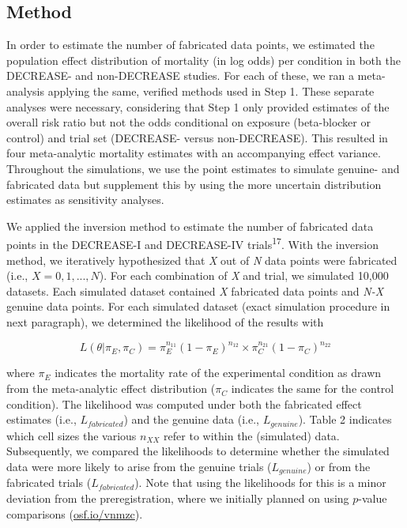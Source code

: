 \documentclass[]{article}
\begin{document}
\subsection{Method}\label{method-1}

In order to estimate the number of fabricated data points, we estimated
the population effect distribution of mortality (in log odds) per
condition in both the DECREASE- and non-DECREASE studies. For each of
these, we ran a meta-analysis applying the same, verified methods used
in Step 1. These separate analyses were necessary, considering that Step
1 only provided estimates of the overall risk ratio but not the odds
conditional on exposure (beta-blocker or control) and trial set
(DECREASE- versus non-DECREASE). This resulted in four meta-analytic
mortality estimates with an accompanying effect variance. Throughout the
simulations, we use the point estimates to simulate genuine- and
fabricated data but supplement this by using the more uncertain
distribution estimates as sensitivity analyses.

We applied the inversion method to estimate the number of fabricated
data points in the DECREASE-I and DECREASE-IV
trials\textsuperscript{17}. With the inversion method, we iteratively
hypothesized that \emph{X} out of \emph{N} data points were fabricated
(i.e., \(X={0, 1, ..., N}\)). For each combination of \emph{X} and
trial, we simulated 10,000 datasets. Each simulated dataset contained
\emph{X} fabricated data points and \emph{N-X} genuine data points. For
each simulated dataset (exact simulation procedure in next paragraph),
we determined the likelihood of the results with

\begin{equation}
\label{eq1}
L(\theta|\pi_{E},\pi_{C})=\pi_{E}^{n_{11}}(1-\pi_{E})^{n_{12}} \times \pi_{C}^{n_{21}}(1 - \pi_{C})^{n_{22}}
\end{equation}

where \(\pi_{E}\) indicates the mortality rate of the experimental
condition as drawn from the meta-analytic effect distribution
(\(\pi_{C}\) indicates the same for the control condition). The
likelihood was computed under both the fabricated effect estimates
(i.e., \(L_{fabricated}\)) and the genuine data (i.e., \(L_{genuine}\)).
Table 2 indicates which cell sizes the various \(n_{XX}\) refer to
within the (simulated) data. Subsequently, we compared the likelihoods
to determine whether the simulated data were more likely to arise from
the genuine trials (\(L_{genuine}\)) or from the fabricated trials
(\(L_{fabricated}\)). Note that using the likelihoods for this is a
minor deviation from the preregistration, where we initially planned on
using \(p\)-value comparisons
(\href{https://osf.io/vnmzc}{osf.io/vnmzc}).
\end{document}
